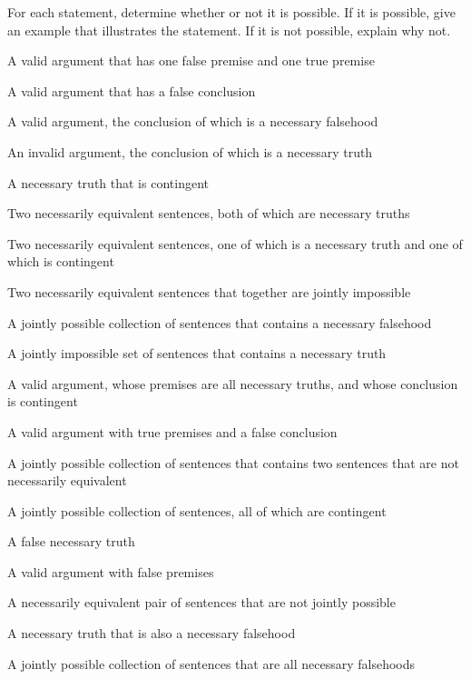 \problempart
\label{pr.EnglishCombinations2}
For each statement, determine whether or not it is possible. If it is possible, give an example that illustrates the statement. If it is not possible, explain why not.
\begin{earg}
\item A valid argument that has one false premise and one true premise
\item A valid argument that has a false conclusion
\item A valid argument, the conclusion of which is a necessary falsehood
\item An invalid argument, the conclusion of which is a necessary truth
\item A necessary truth that is contingent
\item Two necessarily equivalent sentences, both of which are necessary truths
\item Two necessarily equivalent sentences, one of which is a necessary truth and one of which is contingent
\item Two necessarily equivalent sentences that together are jointly impossible
\item A jointly possible collection of sentences that contains a necessary falsehood
\item A jointly impossible set of sentences that contains a necessary truth

\item A valid argument, whose premises are all necessary truths, and whose conclusion is contingent
\item A valid argument with true premises and a false conclusion
\item A jointly possible collection of sentences that contains two sentences that are not necessarily equivalent
\item A jointly possible collection of sentences, all of which are contingent
\item A false necessary truth
\item A valid argument with false premises
\item A necessarily equivalent pair of sentences that are not jointly possible
\item A necessary truth that is also a necessary falsehood
\item A jointly possible collection of sentences that are all necessary falsehoods
\end{earg}




